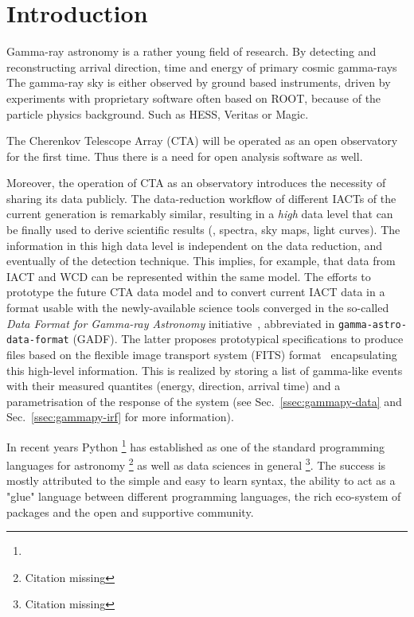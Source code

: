 \section{Introduction}
\label{sec:introduction}


Gamma-ray astronomy is a rather young field of research. By detecting and
reconstructing arrival direction, time and energy of primary cosmic gamma-rays
The gamma-ray sky is either observed by ground based instruments, driven by
experiments with proprietary software often based on ROOT, because of the
particle physics background. Such as HESS, Veritas or Magic.

The Cherenkov Telescope Array (CTA) will be operated as an open observatory for
the first time. Thus there is a need for open analysis software as well.

Moreover, the operation of CTA as an observatory introduces the necessity of
sharing its data publicly. The data-reduction workflow of different IACTs of
the current generation is remarkably similar, resulting in a \textit{high} data
level that can be finally used to derive scientific results (, spectra, sky
maps, light curves). The information in this high data level is independent on
the data reduction, and eventually of the detection technique. This implies,
for example, that data from IACT and WCD can be represented within the same
model. The efforts to prototype the future CTA data model and to convert
current IACT data in a format usable with the newly-available science tools
converged in the so-called \textit{Data Format for Gamma-ray Astronomy}
initiative~\citep{gadf_proc, gadf_universe}, abbreviated in
\texttt{gamma-astro-data-format} (GADF). The latter proposes prototypical
specifications to produce files based on the flexible image transport system
(FITS) format~\citep{fits} encapsulating this high-level information. This is
realized by storing a list of gamma-like events with their measured quantites
(energy, direction, arrival time) and a parametrisation of the response of the
system (see Sec.~\ref{ssec:gammapy-data} and Sec.~\ref{ssec:gammapy-irf} for
more information).

In recent years Python \footnote{\PythonUrl} has established as one of the
standard programming  languages for astronomy \footnote{Citation missing} as
well as data sciences in  general \footnote{Citation missing}. The success is
mostly attributed to the simple and easy to learn syntax, the ability to act as
a "glue" language between different programming languages, the rich eco-system
of packages and the open and supportive community.

